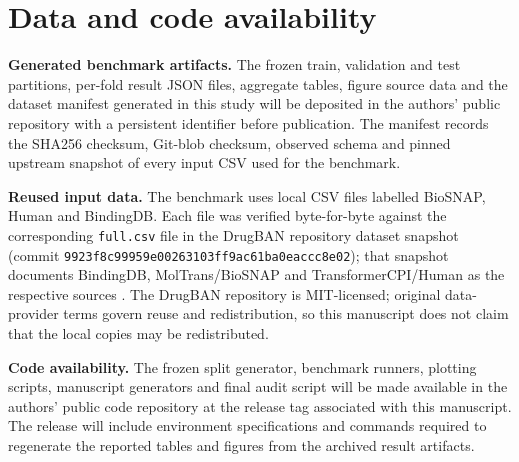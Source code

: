 \section{Data and code availability}

\noindent\textbf{Generated benchmark artifacts.} The frozen train, validation
and test partitions, per-fold result JSON files, aggregate tables, figure source
data and the dataset manifest generated in this study will be deposited in the
authors' public repository with a persistent identifier before publication. The
manifest records the SHA256 checksum, Git-blob checksum, observed schema and
pinned upstream snapshot of every input CSV used for the benchmark.

\noindent\textbf{Reused input data.} The benchmark uses local CSV files labelled
BioSNAP, Human and BindingDB. Each file was verified byte-for-byte against the
corresponding \texttt{full.csv} file in the DrugBAN repository dataset snapshot
(commit \texttt{9923f8c99959e00263103ff9ac61ba0eaccc8e02}); that snapshot
documents BindingDB, MolTrans/BioSNAP and TransformerCPI/Human as the respective
sources \cite{bai2023drugban,liu2007bindingdb,huang2021moltrans,chen2020transformercpi}.
The DrugBAN repository is MIT-licensed; original data-provider terms govern
reuse and redistribution, so this manuscript does not claim that the local
copies may be redistributed.

\noindent\textbf{Code availability.} The frozen split generator, benchmark
runners, plotting scripts, manuscript generators and final audit script will be
made available in the authors' public code repository at the release tag associated
with this manuscript. The release
will include environment specifications and commands required to regenerate the
reported tables and figures from the archived result artifacts.
